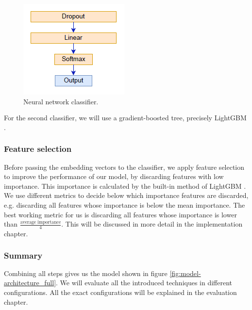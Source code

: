 \begin{figure}[h]
  \centering
  \includegraphics[scale=1]{fig/nn_1.png}
  \caption{Neural network classifier.}%
  \label{fig:nn1}
\end{figure}

For the second classifier, we will use a gradient-boosted tree, precisely LightGBM \cite{lgbm}.

\subsubsection{Feature selection}
Before passing the embedding vectors to the classifier, we apply feature selection to improve the performance of our model, by discarding features with low importance. This importance is calculated by the built-in method of LightGBM \cite{lgbmimportance}. We use different metrics to decide below which importance features are discarded, e.g. discarding all features whose importance is below the mean importance. The best working metric for us is discarding all features whose importance is lower than $\frac{\text{average importance}}{4}$. This will be discussed in more detail in the implementation chapter.

\subsubsection{Summary}
Combining all steps gives us the model shown in figure \ref{fig:model-architecture_full}. We will evaluate all the introduced techniques in different configurations. All the exact configurations will be explained in the evaluation chapter.

